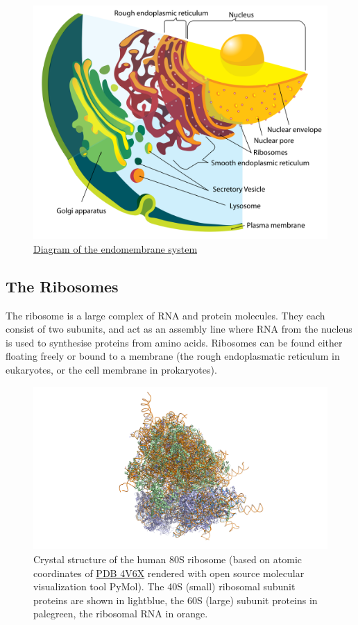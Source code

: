\begin{figure}

{\centering \includegraphics[width=0.7\linewidth]{./figures/cells/Endomembrane_system_diagram_en} 

}

\caption{\href{https://commons.wikimedia.org/wiki/File:Endomembrane_system_diagram_en.svg}{Diagram of the endomembrane system}}\label{fig:endomembranediagram}
\end{figure}

\hypertarget{the-ribosomes}{%
\subsection{The Ribosomes}\label{the-ribosomes}}

The ribosome is a large complex of RNA and protein molecules. They each consist of two subunits, and act as an assembly line where RNA from the nucleus is used to synthesise proteins from amino acids. Ribosomes can be found either floating freely or bound to a membrane (the rough endoplasmatic reticulum in eukaryotes, or the cell membrane in prokaryotes).



\begin{figure}

{\centering \includegraphics[width=0.7\linewidth]{./figures/translation/human_ribosome} 

}

\caption{Crystal structure of the human 80S ribosome (based on atomic coordinates of \href{https://www.rcsb.org/structure/4v6x}{PDB 4V6X} rendered with open source molecular visualization tool PyMol). The 40S (small) ribosomal subunit proteins are shown in lightblue, the 60S (large) subunit proteins in palegreen, the ribosomal RNA in orange.}\label{fig:ribosomestructure}
\end{figure}

